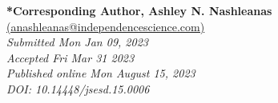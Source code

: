 \documentclass[11.5pt]{sig-alternate}
\begin{document}



\textbf{*Corresponding Author, Ashley N. Nashleanas}
\href{mailto:anashleanas@independencescience.com}{(anashleanas@independencescience.com)} \\
\textit{Submitted Mon Jan 09, 2023 }\\
\textit{Accepted Fri Mar 31 2023} \\
\textit{Published online Mon August 15, 2023} \\
\textit{DOI: 10.14448/jsesd.15.0006} \\

\pagebreak
\pagebreak

\vspace{5mm}
\section*{\vspace{140mm}}
\end{document}
